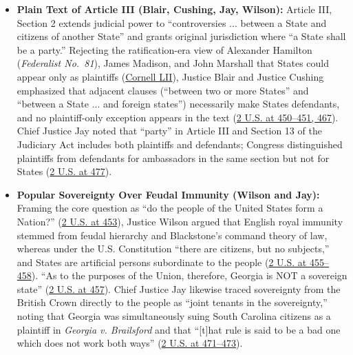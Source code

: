 \documentclass[12pt]{article}
\begin{document}
\begin{itemize}
  \item \textbf{Plain Text of Article III (Blair, Cushing, Jay, Wilson):} Article III, Section 2 extends judicial power to ``controversies ... between a State and citizens of another State'' and grants original jurisdiction where ``a State shall be a party.'' Rejecting the ratification-era view of Alexander Hamilton (\emph{Federalist No.~81}), James Madison, and John Marshall that States could appear only as plaintiffs (\href{https://www.law.cornell.edu/constitution-conan/amendment-11/historical-background-on-eleventh-amendment}{Cornell LII}), Justice Blair and Justice Cushing emphasized that adjacent clauses (``between two or more States'' and ``between a State ... and foreign states'') necessarily make States defendants, and no plaintiff-only exception appears in the text (\href{https://supreme.justia.com/cases/federal/us/2/419/}{2 U.S. at 450--451, 467}). Chief Justice Jay noted that ``party'' in Article III and Section 13 of the Judiciary Act includes both plaintiffs and defendants; Congress distinguished plaintiffs from defendants for ambassadors in the same section but not for States (\href{https://supreme.justia.com/cases/federal/us/2/419/}{2 U.S. at 477}).
  \item \textbf{Popular Sovereignty Over Feudal Immunity (Wilson and Jay):} Framing the core question as ``do the people of the United States form a Nation?'' (\href{https://supreme.justia.com/cases/federal/us/2/419/}{2 U.S. at 453}), Justice Wilson argued that English royal immunity stemmed from feudal hierarchy and Blackstone's command theory of law, whereas under the U.S. Constitution ``there are citizens, but no subjects,'' and States are artificial persons subordinate to the people (\href{https://supreme.justia.com/cases/federal/us/2/419/}{2 U.S. at 455--458}). ``As to the purposes of the Union, therefore, Georgia is NOT a sovereign state'' (\href{https://supreme.justia.com/cases/federal/us/2/419/}{2 U.S. at 457}). Chief Justice Jay likewise traced sovereignty from the British Crown directly to the people as ``joint tenants in the sovereignty,'' noting that Georgia was simultaneously suing South Carolina citizens as a plaintiff in \emph{Georgia v. Brailsford} and that ``[t]hat rule is said to be a bad one which does not work both ways'' (\href{https://supreme.justia.com/cases/federal/us/2/419/}{2 U.S. at 471--473}).

\end{itemize}
\end{document}
